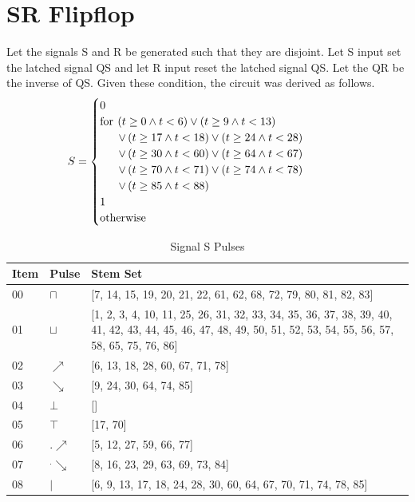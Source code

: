 \documentclass[10pt,journal]{IEEEtran}
\begin{document}
\section{SR Flipflop}
Let the signals S and R be generated such that they are disjoint. Let S     input set the latched signal QS and let R input reset the latched signal     QS. Let the QR be the inverse of QS. Given these condition, the circuit     was derived as follows.
\begin{equation}
 \begin{minipage}{250pt}
\begin{flushleft} $\displaystyle S = \begin{cases} 0 & \\  \text{for}\: \left(t \geq 0 \wedge t < 6\right) \vee \left(t \geq 9 \wedge t < 13\right) \\ \quad \ \  \vee \left(t \geq 17 \wedge t < 18\right) \vee \left(t \geq 24 \wedge t < 28\right) \\ \quad \ \  \vee \left(t \geq 30 \wedge t < 60\right) \vee \left(t \geq 64 \wedge t < 67\right) \\ \quad \ \  \vee \left(t \geq 70 \wedge t < 71\right) \vee \left(t \geq 74 \wedge t < 78\right) \\ \quad \ \  \vee \left(t \geq 85 \wedge t < 88\right) \\1 & \\  \text{otherwise} \end{cases}$  \end{flushleft}
 \end{minipage}
 \end{equation}
\begin{table}[H] \caption{Signal S Pulses}\centering\begin{tabular}{|p{.4cm}|p{.5cm}|p{6.5cm}|}\hline Item&Pulse &Stem Set\\ \hline 00& \footnotesize$\sqcap$ & \footnotesize[7, 14, 15, 19, 20, 21, 22, 61, 62, 68, 72, 79, 80, 81, 82, 83]\\ \hline 01& \footnotesize$\sqcup$ & \footnotesize[1, 2, 3, 4, 10, 11, 25, 26, 31, 32, 33, 34, 35, 36, 37, 38, 39, 40, 41, 42, 43, 44, 45, 46, 47, 48, 49, 50, 51, 52, 53, 54, 55, 56, 57, 58, 65, 75, 76, 86]\\ \hline 02& \footnotesize$\nearrow$ & \footnotesize[6, 13, 18, 28, 60, 67, 71, 78]\\ \hline 03& \footnotesize$\searrow$ & \footnotesize[9, 24, 30, 64, 74, 85]\\ \hline 04& \footnotesize$\bot$ & \footnotesize[]\\ \hline 05& \footnotesize$\top$ & \footnotesize[17, 70]\\ \hline 06& \footnotesize$.\nearrow$ & \footnotesize[5, 12, 27, 59, 66, 77]\\ \hline 07& \footnotesize$^.\searrow$ & \footnotesize[8, 16, 23, 29, 63, 69, 73, 84]\\ \hline 08& \footnotesize$|$ & \footnotesize[6, 9, 13, 17, 18, 24, 28, 30, 60, 64, 67, 70, 71, 74, 78, 85]\\ \hline \end{tabular} \end{table} 
\end{document}
